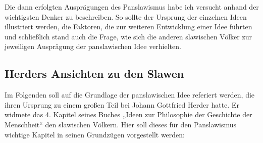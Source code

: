 \documentclass{../../sem_paper}
\begin{document}
Die dann erfolgten Ausprägungen des Panslawismus habe ich versucht anhand der wichtigsten
Denker zu beschreiben. So sollte der Ursprung der einzelnen Ideen illustriert werden, die
Faktoren, die zur weiteren Entwicklung einer Idee führten und schließlich stand auch die
Frage, wie sich die anderen slawischen Völker zur jeweiligen Ausprägung der panslawischen
Idee verhielten.


\subsection{Herders Ansichten zu den Slawen}
Im Folgenden soll auf die Grundlage der panslawischen Idee referiert werden, die ihren
Ursprung zu einem großen Teil bei Johann Gottfried Herder hatte. Er widmete das 4. Kapitel
seines Buches „Ideen zur Philosophie der Geschichte der Menschheit“ den slawischen Völkern.
Hier soll dieses für den Panslawismus wichtige Kapitel in seinen Grundzügen vorgestellt
werden:
\end{document}
